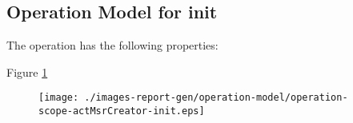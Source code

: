 \subsection{Operation Model for init}

\label{OM-init}


The  operation has the following properties:

	\begin{operationmodel}



		


	\end{operationmodel}



	
	
	
	





Figure \ref{fig:lu.uni.lassy.excalibur.examples.icrash-OM-scopeView-operation-scope-actMsrCreator-init}

\begin{figure}[htbp]
\begin{center}

\texttt{[image: ./images-report-gen/operation-model/operation-scope-actMsrCreator-init.eps]}
\end{center}
\caption[lu.uni.lassy.excalibur.examples.icrash Operation Scope: operation-scope-actMsrCreator-init]{}
\label{fig:lu.uni.lassy.excalibur.examples.icrash-OM-scopeView-operation-scope-actMsrCreator-init}
\end{figure}
\vspace{0.5cm}

